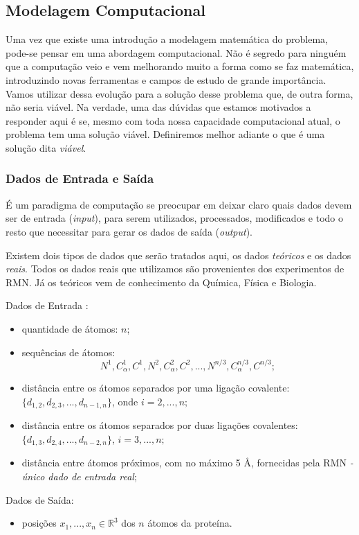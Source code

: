 \documentclass[a4paper,12pt]{article}
\begin{document}
	
	\subsection{Modelagem Computacional}
	
	Uma vez que existe uma introdução a modelagem matemática do problema, pode-se pensar em uma abordagem computacional. Não é segredo para ninguém que a computação veio e vem melhorando muito a forma como se faz matemática, introduzindo novas ferramentas e campos de estudo de grande importância. Vamos utilizar dessa evolução para a solução desse problema que, de outra forma, não seria viável. Na verdade, uma das dúvidas que estamos motivados a responder aqui é se, mesmo com toda nossa capacidade computacional atual, o problema tem uma solução viável. Definiremos melhor adiante o que é uma solução dita \textit{viável}. 
	
	\subsubsection*{Dados de Entrada e Saída}
	É um paradigma de computação se preocupar em deixar claro quais dados devem ser de entrada (\textit{input}), para serem utilizados, processados, modificados e todo o resto que necessitar para gerar os dados de saída (\textit{output}).
	
	Existem dois tipos de dados que serão tratados aqui, os dados \textit{teóricos} e os dados \textit{reais}. Todos os dados reais que utilizamos são provenientes dos experimentos de RMN. Já os teóricos vem de conhecimento da Química, Física e Biologia.
	
	\begin{description}
		\item{Dados de Entrada \cite{carlileBook31Coloquio}}:
		\begin{itemize}
			\item quantidade de átomos: $n$;
			\item sequências de átomos:
			$$N^1,C^{1}_{\alpha},C^1,N^2,C^{2}_{\alpha},C^2, ...,N^{n/3},C^{n/3}_{\alpha},C^{n/3};
			$$
			\item distância entre os átomos separados por uma ligação covalente: $\{d_{1,2},d_{2,3}, ...,d_{n-1,n}\}$, onde $i = 2, ..., n;$
			\item distância entre os átomos separados por duas ligações covalentes: $\{d_{1,3},d_{2,4}, ...,d_{n-2,n}\}$, $i=3, ..., n;$
			\item distância entre átomos próximos, com no máximo 5 \AA, fornecidas pela RMN \textit{- único dado de entrada real};
		\end{itemize}
		\item{Dados de Saída:}
		\begin{itemize}
			\item posições $x_1, ...,x_n \in\mathbb{R}^3$ dos $n$ átomos da proteína.
		\end{itemize}
	\end{description}
	
\end{document}
